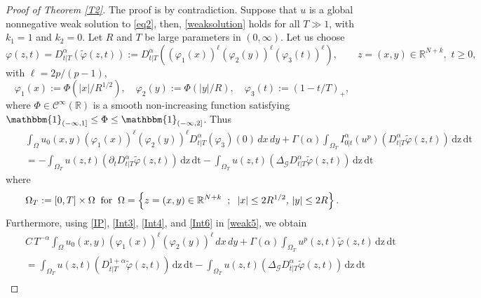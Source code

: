 \documentclass[reqno,11pt]{amsart}
\numberwithin{equation}{section}
\newcommand{\abs}[1]{\lvert#1\rvert}
\begin{document}
\begin{proof}[Proof of Theorem \ref{T2}]%
	
	
	The proof is by contradiction. Suppose that $u$ is a global nonnegative weak
	solution to \eqref{eq2}, then,  \eqref{weaksolution} holds for all $T\gg1$, with $k_1=1$ and $k_2=0$. Let $R$ and $T$ be large parameters in $(0,\infty)$. Let us choose 
	$$\varphi(z,t)=D^\alpha_{t|T}\left(\widetilde{\varphi}(z,t)\right):=D^\alpha_{t|T}\left(\left(\varphi_1(x)\right)^\ell \left(\varphi_2(y)\right)^\ell\left(\varphi_3(t)\right)^\ell\right),\qquad z=(x,y)\in\mathbb{R}^{N+k},\,\,t\geq 0,$$
	with $\ell= 2p/(p-1)$,
	$$\varphi_1(x):=\Phi\left(\abs{x}/R^{1/2}\right),\quad \varphi_2(y):=\Phi\left(\abs{y}/R\right),\quad \varphi_3(t):=\left(1-t/T\right)_+,$$
	where $\Phi\in \mathcal{C}^\infty(\mathbb{R})$ is a smooth non-increasing function 
	satisfying $\mathbbm{1}_{(-\infty,1]} \leq \Phi\leq \mathbbm{1}_{(-\infty,2]}$.
	Thus
	\begin{eqnarray}\label{weak5}
		&&\int_{\Omega}u_0(x,y)\left(\varphi_1(x)\right)^\ell \left(\varphi_2(y)\right)^\ell D^\alpha_{t|T}(\varphi_3)(0)\,dx\,dy + \Gamma(\alpha) \int_{\Omega_T} I^\alpha_{0|t}(u^{p}) \left(D^{\alpha}_{t|T}\widetilde{\varphi}(z,t)\right)\,\mathrm{dz}\,\mathrm{dt}\nonumber\\
		&&=-\int_{\Omega_T} u(z,t) \left(\partial_tD^{\alpha}_{t|T}\widetilde{\varphi}(z,t)\right)\,\mathrm{dz}\,\mathrm{dt} -\int_{\Omega_T}u(z,t) \left(\Delta_{\mathcal{G}}D^{\alpha}_{t|T}\widetilde{\varphi}(z,t) \right)\,\mathrm{dz}\,\mathrm{dt}
	\end{eqnarray}
	where
	\[
	\Omega_T:=[0,T]\times\Omega\;\;\text{for}\;\; \Omega=\left\{ z=(x,y)\in{\mathbb{R}}^{N+k}\hspace{2
		mm};\hspace{2mm}|x|\leq 2 R^{1/2},\,|y|\leq 2 R\right\}.
	\]
	Furthermore, using \eqref{IP}, \eqref{Int3}, \eqref{Int4}, and \eqref{Int6} in  \eqref{weak5}, we obtain
	\begin{eqnarray}
		&&C\,T^{-\alpha}\int_{\Omega}u_0(x,y)\left(\varphi_1(x)\right)^\ell \left(\varphi_2(y)\right)^\ell \,dx\,dy+\Gamma(\alpha)\int_{\Omega_T} u^p(z,t) \widetilde{\varphi}(z,t)\,\mathrm{dz}\,\mathrm{dt} \nonumber\\
		&&=\int_{\Omega_T}u(z,t) \left(D^{1+\alpha}_{t|T}\widetilde{\varphi}(z,t)\right) \,\mathrm{dz}\,\mathrm{dt} -\int_{\Omega_T}u(z,t) \left(\Delta_{\mathcal{G}}D^{\alpha}_{t|T}\widetilde{\varphi}(z,t)\right)\,\mathrm{dz}\,\mathrm{dt} \nonumber\\

\end{eqnarray}
\end{proof}
\end{document}
